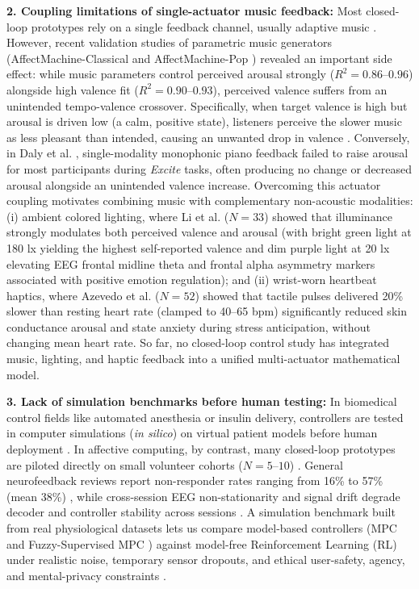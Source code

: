 \documentclass[a4paper,fleqn]{cas-dc}
\begin{document}
\textbf{2. Coupling limitations of single-actuator music feedback:} Most closed-loop prototypes rely on a single feedback channel, usually adaptive music \cite{sayal2025music,daly2016affective,ehrlich2019closed}. However, recent validation studies of parametric music generators (AffectMachine-Classical \cite{agres2023affectmachine} and AffectMachine-Pop \cite{agres2025affectmachine}) revealed an important side effect: while music parameters control perceived arousal strongly ($R^2 = 0.86\text{--}0.96$) alongside high valence fit ($R^2 = 0.90\text{--}0.93$), perceived valence suffers from an unintended tempo-valence crossover. Specifically, when target valence is high but arousal is driven low (a calm, positive state), listeners perceive the slower music as less pleasant than intended, causing an unwanted drop in valence \cite{ehrlich2019closed,agres2023affectmachine,agres2025affectmachine}. Conversely, in Daly et al. \cite{daly2016affective}, single-modality monophonic piano feedback failed to raise arousal for most participants during \textit{Excite} tasks, often producing no change or decreased arousal alongside an unintended valence increase. Overcoming this actuator coupling motivates combining music with complementary non-acoustic modalities: (i) ambient colored lighting, where Li et al. \cite{li2025designing} ($N = 33$) showed that illuminance strongly modulates both perceived valence and arousal (with bright green light at 180 lx yielding the highest self-reported valence and dim purple light at 20 lx elevating EEG frontal midline theta and frontal alpha asymmetry markers associated with positive emotion regulation); and (ii) wrist-worn heartbeat haptics, where Azevedo et al. \cite{azevedo2017calming} ($N = 52$) showed that tactile pulses delivered 20\% slower than resting heart rate (clamped to 40--65 bpm) significantly reduced skin conductance arousal and state anxiety during stress anticipation, without changing mean heart rate. So far, no closed-loop control study has integrated music, lighting, and haptic feedback into a unified multi-actuator mathematical model.

\textbf{3. Lack of simulation benchmarks before human testing:} In biomedical control fields like automated anesthesia or insulin delivery, controllers are tested in computer simulations (\textit{in silico}) on virtual patient models before human deployment \cite{azgomi2022enhancement}. In affective computing, by contrast, many closed-loop prototypes are piloted directly on small volunteer cohorts ($N = 5\text{--}10$) \cite{zhang2026closed,sayal2025music,ramirez2015musical,daly2016affective,ehrlich2019closed}. General neurofeedback reviews report non-responder rates ranging from 16\% to 57\% (mean 38\%) \cite{sayal2025music}, while cross-session EEG non-stationarity and signal drift degrade decoder and controller stability across sessions \cite{zhang2026closed,wu2023affective}. A simulation benchmark built from real physiological datasets lets us compare model-based controllers (MPC and Fuzzy-Supervised MPC \cite{azgomi2022enhancement}) against model-free Reinforcement Learning (RL) \cite{pohlmeyer2014using} under realistic noise, temporary sensor dropouts, and ethical user-safety, agency, and mental-privacy constraints \cite{steinert2020wired}.
\end{document}
